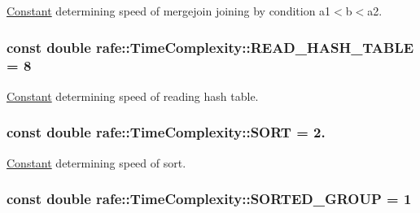 \hyperlink{classrafe_1_1_constant}{Constant} determining speed of mergejoin joining by condition a1$<$b$<$a2. \hypertarget{classrafe_1_1_time_complexity_a61e08b141c8e61b50a980efc48d05cc2}{
\subsubsection[{R\+E\+A\+D\+\_\+\+H\+A\+S\+H\+\_\+\+T\+A\+B\+L\+E}]{\setlength{\rightskip}{0pt plus 5cm}const double rafe\+::\+Time\+Complexity\+::\+R\+E\+A\+D\+\_\+\+H\+A\+S\+H\+\_\+\+T\+A\+B\+L\+E = 8\hspace{0.3cm}{\ttfamily [static]}}}\label{classrafe_1_1_time_complexity_a61e08b141c8e61b50a980efc48d05cc2}
\hyperlink{classrafe_1_1_constant}{Constant} determining speed of reading hash table. \hypertarget{classrafe_1_1_time_complexity_a4400cd269924110e53d97b3e074de846}{
\subsubsection[{S\+O\+R\+T}]{\setlength{\rightskip}{0pt plus 5cm}const double rafe\+::\+Time\+Complexity\+::\+S\+O\+R\+T = 2.\hspace{0.3cm}{\ttfamily [static]}}}\label{classrafe_1_1_time_complexity_a4400cd269924110e53d97b3e074de846}
\hyperlink{classrafe_1_1_constant}{Constant} determining speed of sort. \hypertarget{classrafe_1_1_time_complexity_a0a177ac807f6258a6e2b53e0fb86a482}{
\subsubsection[{S\+O\+R\+T\+E\+D\+\_\+\+G\+R\+O\+U\+P}]{\setlength{\rightskip}{0pt plus 5cm}const double rafe\+::\+Time\+Complexity\+::\+S\+O\+R\+T\+E\+D\+\_\+\+G\+R\+O\+U\+P = 1\hspace{0.3cm}{\ttfamily [static]}}}\label{classrafe_1_1_time_complexity_a0a177ac807f6258a6e2b53e0fb86a482}
